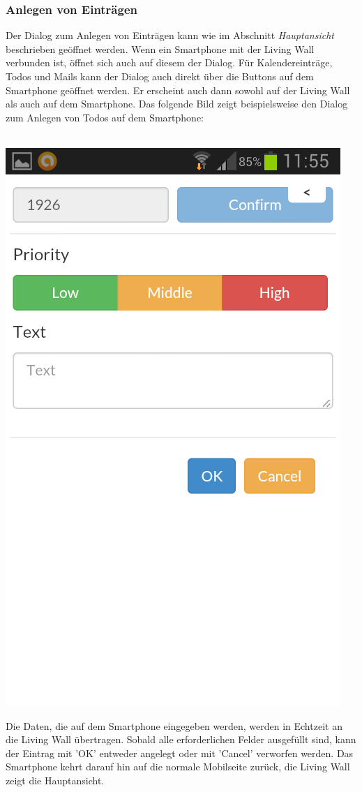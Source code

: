 \documentclass[10pt,a4paper]{report}
\begin{document}
		\subsubsection{Anlegen von Einträgen}
		Der Dialog zum Anlegen von Einträgen kann wie im Abschnitt \textit{Hauptansicht} beschrieben geöffnet werden. Wenn ein Smartphone mit der Living Wall verbunden ist, öffnet sich auch auf diesem der Dialog. Für Kalendereinträge, Todos und Mails kann der Dialog auch direkt über die Buttons auf dem Smartphone geöffnet werden. Er erscheint auch dann sowohl auf der Living Wall als auch auf dem Smartphone. Das folgende Bild zeigt beispielsweise den Dialog zum Anlegen von Todos auf dem Smartphone:\\\\
		\begin{center}
		\includegraphics[scale=0.3, trim=0 8cm 0 0]{createTodoMobile}
		\end{center}
		Die Daten, die auf dem Smartphone eingegeben werden, werden in Echtzeit an die Living Wall übertragen. Sobald alle erforderlichen Felder ausgefüllt sind, kann der Eintrag mit 'OK' entweder angelegt oder mit 'Cancel' verworfen werden. Das Smartphone kehrt darauf hin auf die normale Mobilseite zurück, die Living Wall zeigt die Hauptansicht.
\end{document}
